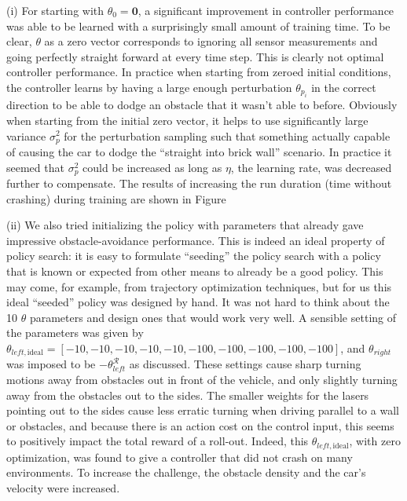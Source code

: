 \documentclass{article}
\begin{document}
(i) For starting with $\theta_0 = \mathbf{0}$, a significant improvement in controller performance was able to be learned with a surprisingly small amount of training time.  To be clear, $\theta$ as a zero vector corresponds to ignoring all sensor measurements and going perfectly straight forward at every time step.  This is clearly not optimal controller performance.  In practice when starting from zeroed initial conditions, the controller learns by having a large enough perturbation $\theta_{p_i}$ in the correct direction to be able to dodge an obstacle that it wasn't able to before.  Obviously when starting from the initial zero vector, it helps to use significantly large variance $\sigma_p^2$ for the perturbation sampling such that something actually capable of causing the car to dodge the ``straight into brick wall'' scenario.  In practice it seemed that $\sigma_p^2$ could be increased as long as $\eta$, the learning rate, was decreased further to compensate.  The results  of increasing the run duration (time without crashing) during training are shown in Figure \label{figures/policySearch_zeroVector_duration.png}

(ii) We also tried initializing the policy with parameters that already gave impressive obstacle-avoidance performance.  This is indeed an ideal property of policy search: it is easy to formulate ``seeding'' the policy search with a policy that is known or expected from other means to already be a good policy.  This may come, for example, from trajectory optimization techniques, but for us this ideal ``seeded'' policy was designed by hand. It was not hard to think about the 10 $\theta$ parameters and design ones that would work very well.  A sensible setting of the parameters was given by $\theta_{left, \text{ideal}} = [-10, -10, -10, -10, -10, -100, -100, -100, -100, -100 ]$, and $\theta_{right}$ was imposed to be $-\theta_{left}^{\mathcal{R}}$ as discussed. These settings cause sharp turning motions away from obstacles out in front of the vehicle, and only slightly turning away from the obstacles out to the sides.  The smaller weights for the lasers pointing out to the sides cause less erratic turning when driving parallel to a wall or obstacles, and because there is an action cost on the control input, this seems to positively impact the total reward of a roll-out.  Indeed, this $\theta_{left, \text{ideal}} $, with zero optimization, was found to give a controller that did not crash on many environments.  To increase the challenge, the obstacle density and the car's velocity were increased.
\end{document}
